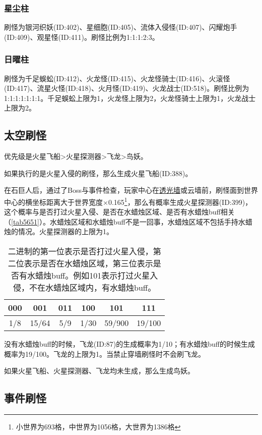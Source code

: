 \subsubsection{星尘柱}
刷怪为银河织妖(ID:402)、星细胞(ID:405)、流体入侵怪(ID:407)、闪耀炮手(ID:409)、观星怪(ID:411)。刷怪比例为1:1:1:2:3。

\subsubsection{日曜柱}
刷怪为千足蜈蚣(ID:412)、火龙怪(ID:415)、火龙怪骑士(ID:416)、火滚怪(ID:417)、流星火怪(ID:418)、火月怪(ID:419)、火龙战士(ID:518)。刷怪比例为1:1:1:1:1:1:1。千足蜈蚣上限为1，火龙怪上限为2，火龙怪骑士上限为1，火龙战士上限为2。

\subsection{太空刷怪}
优先级是火星飞船>火星探测器>飞龙>鸟妖。

如果执行的是火星入侵的刷怪，那么生成火星飞船(ID:388)。

在石巨人后，通过了Boss与事件检查，玩家中心在\hyperref[app9]{透光墙}或云墙前，刷怪面到世界中心的横坐标距离大于世界宽度$\times$0.165\footnote{小世界为693格，中世界为1056格，大世界为1386格}，那么有概率生成火星探测器(ID:399)，这个概率与是否打过火星入侵、是否在水蜡烛区域、是否有水蜡烛buff相关（\autoref{tab5651}）。水蜡烛区域和水蜡烛buff不是一回事，水蜡烛区域不包括手持水蜡烛的情况。火星探测器的上限为1。

\begin{table}[!h]
    \centering
    \begin{tabular}{cccccc}
         000&001&011&100&101&111\\\hline
         1/8&15/64&5/9&1/30&59/900&19/100 
    \end{tabular}
    \caption{二进制的第一位表示是否打过火星入侵，第二位表示是否在水蜡烛区域，第三位表示是否有水蜡烛buff。例如101表示打过火星入侵，不在水蜡烛区域内，有水蜡烛buff。}
    \label{tab5651}
\end{table}

没有水蜡烛buff的时候，飞龙(ID:87)的生成概率为1/10；有水蜡烛buff的时候生成概率为19/100。飞龙的上限为1。当禁止穿墙刷怪时不会刷飞龙。

如果火星飞船、火星探测器、飞龙均未生成，那么生成鸟妖。

\subsection{事件刷怪}

